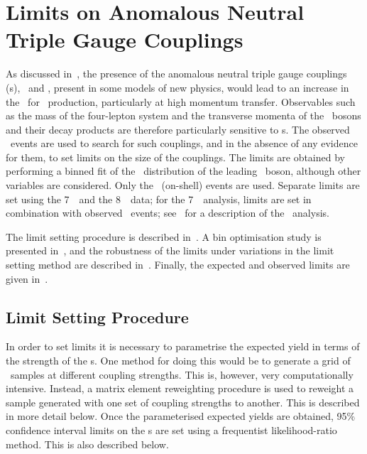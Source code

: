 \graphicspath{{Chapters/TGCLimits/Figures/}}
\chapter{Limits on Anomalous Neutral Triple Gauge Couplings}
\label{chap:TGCLimits}

As discussed in~, the presence of the anomalous neutral
triple gauge couplings (\TGC s), \ZZZ\ and \ZZg, present in some models of new
physics, would lead to an increase in the
\cx\ for \ZZ\ production, particularly at high momentum transfer. Observables
such as the mass of the four-lepton system and the transverse momenta of the \Z\
bosons and their decay products are therefore particularly sensitive to \TGC s.
The observed \ZZllll\ events are used to search for
such couplings, and in the absence of any evidence for them, to set limits on
the size of the couplings. The limits are obtained by performing a binned fit of
the \pt\ distribution of the leading \Z\ boson, although other variables are considered. Only
the \ZZ\ (on-shell) events are used. Separate limits are set using the 7~\tev\
and the 8~\tev\ data; for the 7~\tev\ analysis, limits are set in combination
with observed \ZZllvv\ events; see~\cite{ATLAS:2012kg} for a description of the
\ZZllvv\ analysis.

The limit setting procedure is described in~. A bin
optimisation study is presented in~, and the robustness of the
limits under variations in the limit setting method are described
in~\sec{TGC-Robustness}. Finally, the expected and observed limits are given
in~\sec{TGC-ExpObsLimits}.

\section{Limit Setting Procedure}
\label{sec:TGC-methodology}

In order to set limits it is necessary to parametrise the expected yield in
terms of the strength of the \TGC s. One method for doing this would be
to generate a grid of \mc\ samples at different coupling strengths. This is,
however, very computationally intensive. Instead, a matrix element reweighting procedure
is used to reweight a sample generated with one set of coupling strengths to another.
This is described in more detail below. Once the parameterised expected yields
are obtained, 95\% confidence interval limits on the \TGC s are set using a
frequentist likelihood-ratio method. This is also described below.

